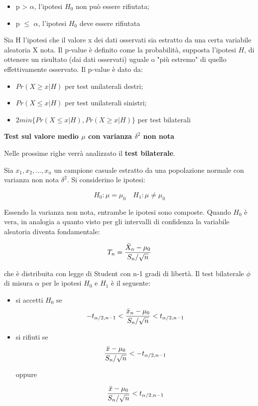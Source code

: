 \begin{itemize}
    \item p > $\alpha$, l'ipotesi $H_0$ non può essere rifiutata;
    \item p $\leq$ $\alpha$, l'ipotesi $H_0$ deve essere rifiutata
\end{itemize}

Sia H l'ipotesi che il valore x dei dati osservati sia estratto da una certa variabile aleatoria X nota. Il p-value è definito come la probabilità, supposta l'ipotesi $H$, di ottenere un risultato (dai dati osservati) uguale o "più estremo" di quello effettivamente osservato. Il p-value è dato da:

\begin{itemize}
    \item $Pr(X \geq x|H)$ per test unilaterali destri;
    \item $Pr(X \leq x|H)$ per test unilaterali sinistri;
    \item $2 min\{Pr(X \leq x|H), Pr(X \geq x|H)\}$ per test bilaterali
\end{itemize}

\vspace{5mm}
\noindent \textbf{Test sul valore medio $\mu$ con varianza $\delta^2$ non nota}

Nelle prossime righe verrà analizzato il \textbf{test bilaterale}.

Sia $x_1, x_2, ..., x_n$ un campione casuale estratto da una popolazione normale con varianza non nota $\delta^2$. Si considerino le ipotesi:

\[H_0: \mu = \mu_0 \quad H_1:\mu \neq \mu_0\]

Essendo la varianza non nota, entrambe le ipotesi sono composte. Quando $H_0$ è vera, in analogia a quanto visto per gli intervalli di confidenza la variabile aleatoria diventa fondamentale:

\[T_n = \frac{\Bar{X}_n - \mu_0}{S_n/ \sqrt{n}}\]

che è distribuita con legge di Student con n-1 gradi di libertà. Il test bilaterale $\phi$ di misura $\alpha$ per le ipotesi $H_0$ e $H_1$ è il seguente:

\begin{itemize}
    \item si accetti $H_0$ se 
    \[-t_{\alpha/2, n-1} < \frac{\Bar{x}_n - \mu_0}{S_n/\sqrt{n}}<t_{\alpha/2, n-1}\]
    \item si rifiuti se
    \[\frac{\Bar{x}-\mu_0}{S_n/\sqrt{n}}<-t_{\alpha/2, n-1}\]

    oppure

    \[\frac{\Bar{x}-\mu_0}{S_n/\sqrt{n}}<t_{\alpha/2, n-1}\]
\end{itemize}

